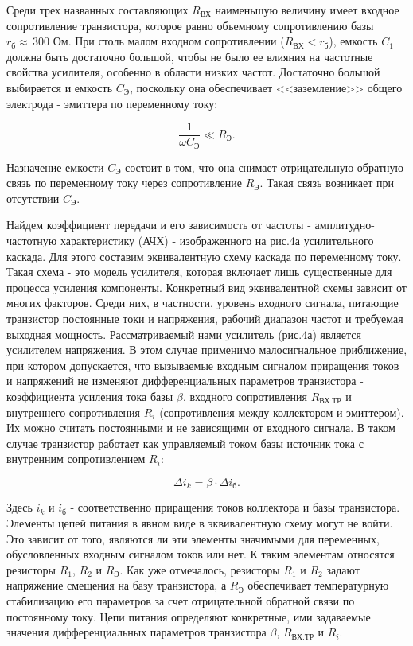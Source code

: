 Среди трех названных составляющих $R_{\text{ВХ}}$ наименьшую величину имеет входное сопротивление транзистора, которое равно объемному сопротивлению базы $r_{\text{б}}\approx \,300$ Ом. При столь малом входном сопротивлении ($R_{\text{ВХ}}<r_{\text{б}}$), емкость $C_1$ должна быть достаточно большой, чтобы не было ее влияния на частотные свойства усилителя, особенно в области низких частот. Достаточно большой выбирается и емкость $C_{\text{Э}}$, поскольку она обеспечивает <<заземление>> общего электрода - эмиттера по переменному току:

\begin{equation}
	\frac{1}{\omega C_{\text{Э}}}\ll R_{\text{Э}}.
	\label{eq:2}
\end{equation}

Назначение емкости $C_{\text{Э}}$ состоит в том, что она снимает отрицательную обратную связь по переменному току через сопротивление $R_{\text{Э}}$. Такая связь возникает при отсутствии $C_{\text{Э}}$.

Найдем коэффициент передачи и его зависимость от частоты - амплитудно-частотную характеристику (АЧХ) - изображенного на рис.4а усилительного каскада. Для этого составим эквивалентную схему каскада по переменному току. Такая схема - это модель усилителя, которая включает лишь существенные для процесса усиления компоненты. Конкретный вид эквивалентной схемы зависит от многих факторов. Среди них, в частности, уровень входного сигнала, питающие транзистор постоянные токи и
напряжения, рабочий диапазон частот и требуемая выходная мощность. Рассматриваемый нами усилитель (рис.4а) является усилителем напряжения. В этом случае применимо малосигнальное приближение, при котором допускается, что вызываемые входным
сигналом приращения токов и напряжений не изменяют дифференциальных параметров транзистора - коэффициента усиления тока базы $\beta$, входного сопротивления $R_{\text{ВХ.ТР}}$ и внутреннего сопротивления $R_i$ (сопротивления между коллектором и эмиттером). Их можно считать постоянными и не зависящими от входного сигнала. В таком случае транзистор работает как управляемый током базы источник тока с внутренним сопротивлением $R_i$:

$$\Delta i_k = \beta \cdot \Delta i_{\text{б}}.$$

Здесь $i_k$ и $i_{\text{б}}$ - соответственно приращения токов коллектора и базы транзистора. Элементы цепей питания в явном виде в эквивалентную схему могут не войти. Это зависит от того, являются ли эти элементы значимыми для переменных, обусловленных входным сигналом токов или нет. К таким элементам относятся резисторы $R_1$, $R_2$ и $R_{\text{Э}}$. Как уже отмечалось, резисторы $R_1$ и $R_2$ задают напряжение смещения на базу транзистора, а $R_{\text{Э}}$ обеспечивает температурную стабилизацию его параметров за счет отрицательной обратной связи по постоянному току. Цепи питания определяют конкретные, ими задаваемые значения дифференциальных параметров транзистора $\beta$, $R_{\text{ВХ.ТР}}$ и $R_i$.

